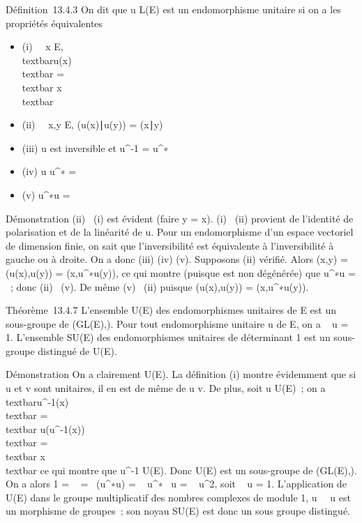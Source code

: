 Définition~13.4.3 On dit que u \in L(E) est un endomorphisme unitaire si
on a les propriétés équivalentes

\begin{itemize}
\itemsep1pt\parskip0pt
\item
  (i) \forall~~x \in E,
  \\textbar{}u(x)\\textbar{}
  =\\textbar{} x\\textbar{}
\item
  (ii) \forall~~x,y \in E,
  (u(x)∣u(y)) =
  (x∣y)
\item
  (iii) u est inversible et u^-1 = u^∗
\item
  (iv) u \cdot u^∗ = \mathrmIdE
\item
  (v) u^∗\cdot u = \mathrmIdE
\end{itemize}

Démonstration (ii) \rigtharrow~(i) est évident (faire y = x). (i) \rigtharrow~(ii) provient de
l'identité de polarisation et de la linéarité de u. Pour un
endomorphisme d'un espace vectoriel de dimension finie, on sait que
l'inversibilité est équivalente à l'inversibilité à gauche ou à droite.
On a donc (iii) \Leftrightarrow (iv)
\Leftrightarrow (v). Supposons (ii) vérifié. Alors \phi(x,y) =
\phi(u(x),u(y)) = \phi(x,u^∗\cdot u(y)), ce qui montre (puisque \phi est
non dégénérée) que u^∗\cdot u =
\mathrmIdE~; donc (ii) \rigtharrow~(v). De même (v)
\rigtharrow~(ii) puisque \phi(u(x),u(y)) = \phi(x,u^∗\cdot u(y)).

Théorème~13.4.7 L'ensemble U(E) des endomorphismes unitaires de E est un
sous-groupe de (GL(E),\cdot). Pour tout endomorphisme unitaire u de E, on a
\textbar{}~
u\textbar{} = 1. L'ensemble SU(E) des endomorphismes unitaires de
déterminant 1 est un sous-groupe distingué de U(E).

Démonstration On a clairement \mathrmIdE \in
U(E). La définition (i) montre évidemment que si u et v sont unitaires,
il en est de même de u \cdot v. De plus, soit u \in U(E)~; on a
\\textbar{}u^-1(x)\\textbar{}
=\\textbar{}
u(u^-1(x))\\textbar{}
=\\textbar{} x\\textbar{} ce qui montre
que u^-1 \in U(E). Donc U(E) est un sous-groupe de (GL(E),\cdot).
On a alors 1 = ~
\mathrmIdE =\
 (u^∗\cdot u)
= ~
u^∗\mathrm{det}~ u
= \textbar{}~
u\textbar{}^2, soit
\textbar{}~
u\textbar{} = 1. L'application de U(E) dans le groupe multiplicatif des
nombres complexes de module 1,
u\mapsto~~
u est un morphisme de groupes~; son noyau SU(E) est donc un sous groupe
distingué.

